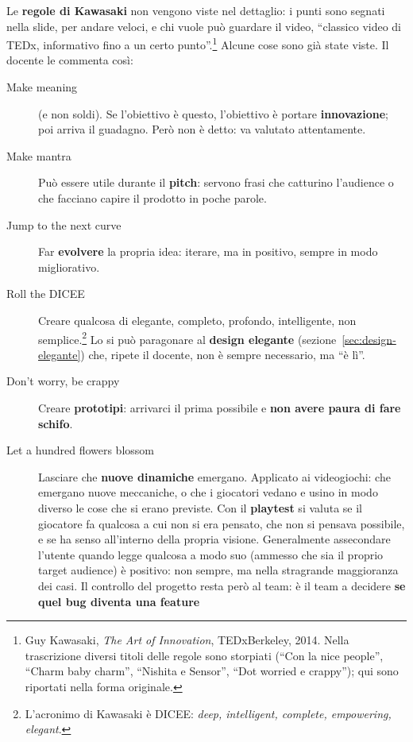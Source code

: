 Le \textbf{regole di Kawasaki} non vengono viste nel dettaglio: i punti sono
segnati nella slide, per andare veloci, e chi vuole può guardare il video,
``classico video di TEDx, informativo fino a un certo
punto''.\footnote{Guy Kawasaki, \emph{The Art of Innovation}, TEDxBerkeley,
2014. Nella trascrizione diversi titoli delle regole sono storpiati
(``Con la nice people'', ``Charm baby charm'', ``Nishita e Sensor'',
``Dot worried e crappy''); qui sono riportati nella forma originale.}
Alcune cose sono già state viste. Il docente le commenta così:
\begin{description}
  \item[Make meaning] (e non soldi). Se l'obiettivo è questo, l'obiettivo è
        portare \textbf{innovazione}; poi arriva il guadagno. Però non è
        detto: va valutato attentamente.
  \item[Make mantra] Può essere utile durante il \textbf{pitch}: servono frasi
        che catturino l'audience o che facciano capire il prodotto in poche
        parole.
  \item[Jump to the next curve] Far \textbf{evolvere} la propria idea:
        iterare, ma in positivo, sempre in modo migliorativo.
  \item[Roll the DICEE] Creare qualcosa di elegante, completo, profondo,
        intelligente, non semplice.\footnote{L'acronimo di Kawasaki è
        DICEE: \emph{deep, intelligent, complete, empowering, elegant}.} Lo si
        può paragonare al \textbf{design elegante}
        (sezione~\ref{sec:design-elegante}) che, ripete il docente, non è
        sempre necessario, ma ``è lì''.
  \item[Don't worry, be crappy] Creare \textbf{prototipi}: arrivarci il prima
        possibile e \textbf{non avere paura di fare schifo}.
  \item[Let a hundred flowers blossom] Lasciare che \textbf{nuove dinamiche}
        emergano. Applicato ai videogiochi: che emergano nuove meccaniche, o
        che i giocatori vedano e usino in modo diverso le cose che si erano
        previste. Con il \textbf{playtest} si valuta se il giocatore fa
        qualcosa a cui non si era pensato, che non si pensava possibile, e se
        ha senso all'interno della propria visione. Generalmente
        assecondare l'utente quando legge qualcosa a modo suo (ammesso che
        sia il proprio target audience) è positivo: non sempre, ma nella
        stragrande maggioranza dei casi. Il controllo del progetto resta però
        al team: è il team a decidere \textbf{se quel bug diventa una feature
}
\end{description}
